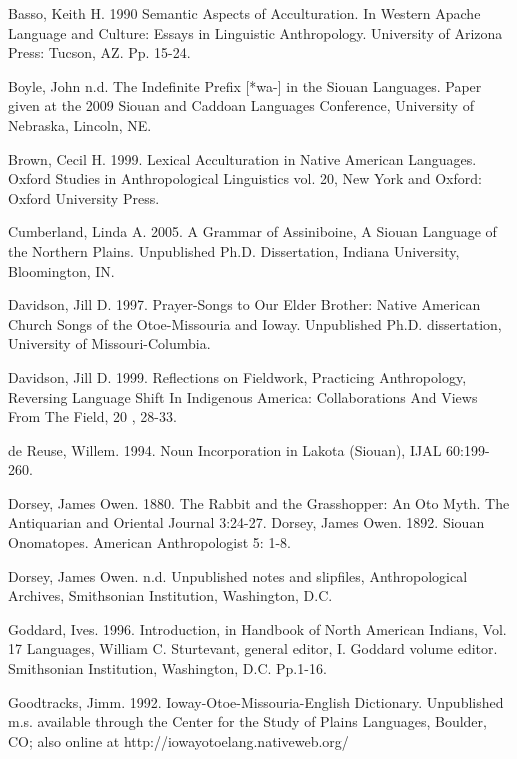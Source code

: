 \documentclass[output=paper]{LSP/langsci}
\begin{document}
\begin{reflist}

Basso, Keith  H. 1990  Semantic Aspects of Acculturation. In Western Apache Language and Culture: Essays in Linguistic Anthropology.  University of Arizona Press:  Tucson, AZ.  Pp. 15-24.   

Boyle, John n.d. The Indefinite Prefix [*wa-] in the Siouan Languages. Paper given at the 2009 Siouan and Caddoan Languages Conference, University of Nebraska, Lincoln, NE.             

Brown, Cecil H. 1999. Lexical Acculturation in Native American Languages.  Oxford Studies in Anthropological Linguistics vol. 20, New York and Oxford:  Oxford University Press. 	   

Cumberland, Linda A.  2005. A Grammar of Assiniboine, A Siouan Language of the Northern Plains.  Unpublished Ph.D. Dissertation, Indiana University, Bloomington, IN.   		   
      
Davidson, Jill D.  1997. Prayer-Songs to Our Elder Brother: Native American Church Songs of the Otoe-Missouria and Ioway. Unpublished Ph.D. dissertation, University of Missouri-Columbia. 	        

Davidson, Jill D. 1999.  Reflections on Fieldwork, Practicing Anthropology, Reversing Language Shift In Indigenous America: Collaborations And Views From The Field, 20 , 28-33.  		 

de Reuse, Willem. 1994.  Noun Incorporation in Lakota (Siouan),  IJAL 60:199-260.  		  

Dorsey, James Owen. 1880. The Rabbit and the Grasshopper:  An Oto Myth. The Antiquarian and Oriental Journal 3:24-27.										   
Dorsey, James Owen. 1892.  Siouan Onomatopes. American Anthropologist 5: 1-8. 

Dorsey, James Owen. n.d.  Unpublished notes and slipfiles, Anthropological Archives, Smithsonian Institution, Washington, D.C.  

Goddard, Ives.  1996.  Introduction, in Handbook of North American Indians, Vol. 17 Languages, William C. Sturtevant, general editor, I. Goddard volume editor.  Smithsonian Institution, Washington, D.C.  Pp.1-16.  							     		                 

Goodtracks, Jimm. 1992. Ioway-Otoe-Missouria-English Dictionary.  Unpublished m.s. available through the Center for the Study of Plains Languages, Boulder, CO;  also online at http://iowayotoelang.nativeweb.org/


\end{reflist}
\end{document}
